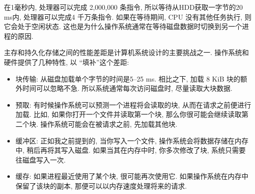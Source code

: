 \documentclass[12pt]{book}
\begin{document}
{在1毫秒内, 处理器可以完成 2,000,000 条指令,
所以等待从HDD获取一字节的20 ms内, 处理器可以完成4 千万条指令. 
如果在等待期间, CPU 没有其他任务执行, 则它会处于空闲状态.
这也是为什么操作系统通常在等待磁盘数据时切换到另一个进程的原因.

主存和持久化存储之间的性能差距是计算机系统设计的主要挑战之一.
操作系统和硬件提供了几种特性, 以 ``填补''这个差距:

\begin{itemize}
\item 块传输: 从磁盘加载单个字节的时间是5--25 ms.
  相比之下, 加载 8 KiB 块的额外时间可以忽略不急.
  所以系统通常每次访问磁盘时, 尽量读取大块数据.


\item 预取: 有时候操作系统可以预测一个进程将会读取的块, 从而在请求之前便进行加载.
  比如, 如果你打开一个文件并读取第一个块, 那么你很可能会继续读取第二个块.
  操作系统可能会在被请求之前, 先加载其他块.

\item 缓冲区: 正如我之前提到的, 当你写入一个文件, 操作系统会将数据存储在内存中,
  稍后再将其写入磁盘. 如果当其在内存中时, 你多次修改了块, 系统只需要往磁盘写入一次.

\item 缓存: 如果进程最近使用了某个块, 很可能再次使用它.
  如果操作系统在内存中保留了该块的副本, 那便可以以内存速度处理将来的请求.


\end{itemize}}
\end{document}
